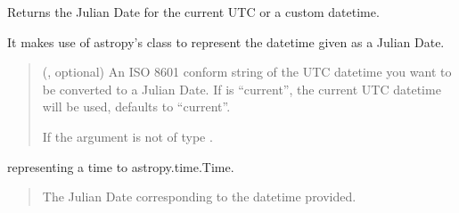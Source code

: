 \documentclass[letterpaper,10pt,english]{sphinxmanual}
\begin{document}
\begin{fulllineitems}
\label{\detokenize{autoapi/aop/aop/index:aop.aop.current_jd}}
\pysigstartsignatures
{}
\pysigstopsignatures
\sphinxAtStartPar
Returns the Julian Date for the current UTC or a custom datetime.

\sphinxAtStartPar
It makes use of astropy’s  class to represent the datetime given as
a Julian Date.
\begin{quote}\begin{description}
\sphinxAtStartPar
{} (, optional) \textendash{} An ISO 8601 conform string of the UTC datetime you want to be converted
to a Julian Date. If  is “current”, the current UTC
datetime will be used, defaults to “current”.

\sphinxAtStartPar
{} \textendash{} If the  argument is not of type .

\end{description}\end{quote}
\begin{description}
\sphinxAtStartPar
representing a time to astropy.time.Time.

\end{description}
\begin{quote}\begin{description}
\sphinxAtStartPar
The Julian Date corresponding to the datetime provided.

\sphinxAtStartPar
{}

\end{description}\end{quote}

\end{fulllineitems}
\end{document}
